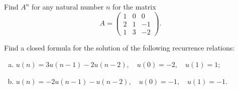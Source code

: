 \begin{problem}
Find $A^n$ for any natural number $n$ for the matrix 
$$
A = \begin{pmatrix}
    1 & 0 & 0 \\
    2 & 1 & -1\\
    1 & 3 & -2
\end{pmatrix}.
$$
\end{problem}

\begin{problem}
Find a closed formula for the solution of the following recurrence relations:
\begin{enumerate}[a) ]
\item $u(n)=3 u(n-1)-2 u(n-2), \quad u(0)=-2, \quad u(1)=1$;
\item $u(n)=-2 u(n-1)-u(n-2), \quad u(0)=-1, \quad u(1)=-1$.
\end{enumerate}
\end{problem}